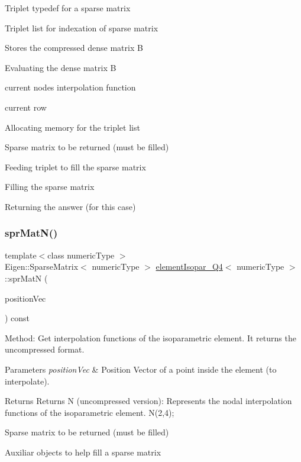 Triplet typedef for a sparse matrix

Triplet list for indexation of sparse matrix

Stores the compressed dense matrix B

Evaluating the dense matrix B

current node\textquotesingle{}s interpolation function

current row

Allocating memory for the triplet list

Sparse matrix to be returned (must be filled)

Feeding triplet to fill the sparse matrix

Filling the sparse matrix

Returning the answer (for this case) \mbox{\label{classelement_isopar___q4_a0ebddfb8cbe82e5ab5593ca9c8f3e95e}} 
\subsubsection{\texorpdfstring{spr\+Mat\+N()}{sprMatN()}}
{\footnotesize\ttfamily template$<$class numeric\+Type $>$ \\
Eigen\+::\+Sparse\+Matrix$<$ numeric\+Type $>$ \mbox{\hyperlink{classelement_isopar___q4}{element\+Isopar\+\_\+\+Q4}}$<$ numeric\+Type $>$\+::spr\+MatN (\begin{DoxyParamCaption}\item[{const Matrix$<$ numeric\+Type, 2, 1 $>$ \&}]{position\+Vec }\end{DoxyParamCaption}) const}

Method\+: Get interpolation functions of the isoparametric element. It returns the uncompressed format. 
\begin{DoxyParams}{Parameters}
{\em position\+Vec} & Position Vector of a point inside the element (to interpolate). \\
\hline
\end{DoxyParams}
\begin{DoxyReturn}{Returns}
Returns N (uncompressed version)\+: Represents the nodal interpolation functions of the isoparametric element. N(2,4); 
\end{DoxyReturn}
Sparse matrix to be returned (must be filled)

Auxiliar objects to help fill a sparse matrix

